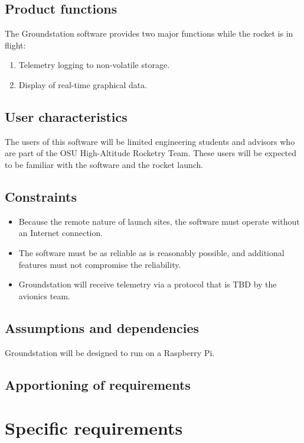 \documentclass[10pt,journal,draftclsnofoot,onecolumn]{IEEEtran}
\begin{document}
	\subsection{Product functions}
	The Groundstation software provides two major functions while the rocket is in flight:
	
	\begin{enumerate}
		\item Telemetry logging to non-volatile storage.
		\item Display of real-time graphical data. 
	\end{enumerate}
	
	\subsection{User characteristics}
	The users of this software will be limited engineering students and advisors who are part of the OSU High-Altitude Rocketry Team.
	These users will be expected to be familiar with the software and the rocket launch.
	
	\subsection{Constraints}
	\begin{itemize}
		\item Because the remote nature of launch sites, the software must operate without an Internet connection.
		\item The software must be as reliable as is reasonably possible, and additional features must not compromise the reliability.
		\item Groundstation will receive telemetry via a protocol that is TBD by the avionics team.
	\end{itemize}
	\subsection{Assumptions and dependencies}
	Groundstation will be designed to run on a Raspberry Pi.
	
	\subsection{Apportioning of requirements}
	
	\section{Specific requirements}
	
\end{document}
